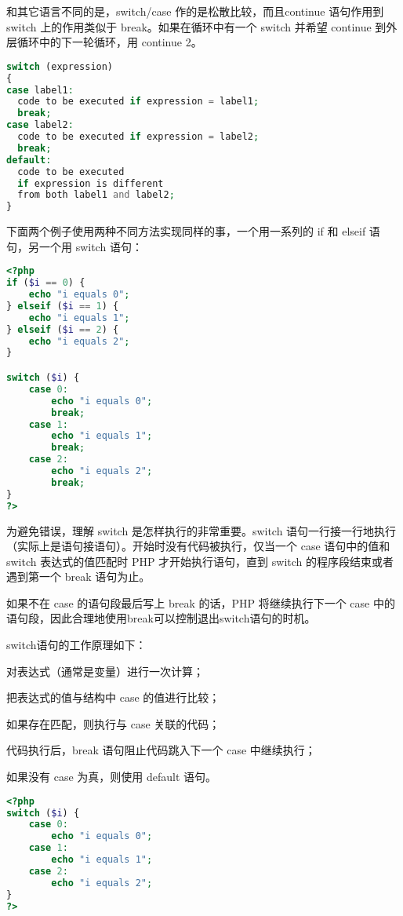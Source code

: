 和其它语言不同的是，switch/case 作的是松散比较，而且continue 语句作用到 switch 上的作用类似于 break。如果在循环中有一个 switch 并希望 continue 到外层循环中的下一轮循环，用 continue 2。

\begin{lstlisting}[language=PHP]
switch (expression)
{
case label1:
  code to be executed if expression = label1;
  break;  
case label2:
  code to be executed if expression = label2;
  break;
default:
  code to be executed
  if expression is different 
  from both label1 and label2;
}
\end{lstlisting}

下面两个例子使用两种不同方法实现同样的事，一个用一系列的 if 和 elseif 语句，另一个用 switch 语句：

\begin{lstlisting}[language=PHP]
<?php
if ($i == 0) {
    echo "i equals 0";
} elseif ($i == 1) {
    echo "i equals 1";
} elseif ($i == 2) {
    echo "i equals 2";
}

switch ($i) {
    case 0:
        echo "i equals 0";
        break;
    case 1:
        echo "i equals 1";
        break;
    case 2:
        echo "i equals 2";
        break;
}
?>
\end{lstlisting}

为避免错误，理解 switch 是怎样执行的非常重要。switch 语句一行接一行地执行（实际上是语句接语句）。开始时没有代码被执行，仅当一个 case 语句中的值和 switch 表达式的值匹配时 PHP 才开始执行语句，直到 switch 的程序段结束或者遇到第一个 break 语句为止。

如果不在 case 的语句段最后写上 break 的话，PHP 将继续执行下一个 case 中的语句段，因此合理地使用break可以控制退出switch语句的时机。


switch语句的工作原理如下：

\begin{compactenum}
\item 对表达式（通常是变量）进行一次计算；
\item 把表达式的值与结构中 case 的值进行比较；
\item 如果存在匹配，则执行与 case 关联的代码；
\item 代码执行后，break 语句阻止代码跳入下一个 case 中继续执行；
\item 如果没有 case 为真，则使用 default 语句。
\end{compactenum}




\begin{lstlisting}[language=PHP]
<?php
switch ($i) {
    case 0:
        echo "i equals 0";
    case 1:
        echo "i equals 1";
    case 2:
        echo "i equals 2";
}
?>
\end{lstlisting}

